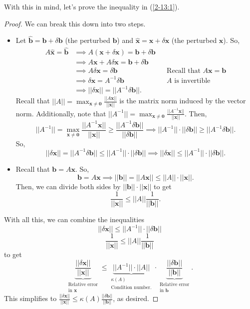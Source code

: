 \documentclass[letterpaper]{article}
\newcommand{\0}{\mathbf{0}}
\renewcommand{\b}{\mathbf{b}}
\newcommand{\x}{\mathbf{x}}
\begin{document}
With this in mind, let's prove the inequality in (\ref{2-13:1}).
\begin{proof}
    We can break this down into two steps. 
    \begin{itemize}
        \item Let $\hat{\b} = \b + \delta\b$ (the perturbed $\b$) and $\hat{\x} = \x + \delta\x$ (the perturbed $\x$). So, 
        \begin{equation*}
            \begin{aligned}
                A\hat{\x} = \hat{\b} &\implies A(\x + \delta\x) = \b + \delta\b \\ 
                    &\implies A\x + A\delta\x = \b + \delta\b \\ 
                    &\implies A\delta\x = \delta\b && \text{Recall that } A\x = \b \\ 
                    &\implies \delta\x = A^{-1}\delta\b && A \text{ is invertible} \\ 
                    &\implies ||\delta\x|| = ||A^{-1} \delta\b||.
            \end{aligned}
        \end{equation*}
        Recall that $||A|| = \max_{\x \neq \0} \frac{||A\x||}{||\x||}$ is the matrix norm induced by the vector norm. Additionally, note that $||A^{-1}|| = \max_{\x \neq \0} \frac{||A^{-1}\x||}{||\x||}$. Then,
        \[||A^{-1}|| = \max_{\x \neq \0} \frac{||A^{-1}\x||}{||\x||} \geq \frac{||A^{-1}\delta\b||}{||\delta\b||} \implies ||A^{-1}|| \cdot ||\delta\b|| \geq ||A^{-1}\delta\b||.\]
        So, 
        \[||\delta\x|| = ||A^{-1} \delta\b|| \leq ||A^{-1}|| \cdot ||\delta\b|| \implies ||\delta\x|| \leq ||A^{-1}|| \cdot ||\delta\b||.\]

        \item Recall that $\b = A\x$. So, 
        \[\b = A\x \implies ||\b|| = ||A\x|| \leq ||A|| \cdot ||\x||.\]
        Then, we can divide both sides by $||\b|| \cdot ||\x||$ to get 
        \[\frac{1}{||\x||} \leq ||A||\frac{1}{||\b||}.\]
    \end{itemize}
    With all this, we can combine the inequalities
    \[||\delta\x|| \leq ||A^{-1}|| \cdot ||\delta\b||\]
    \[\frac{1}{||\x||} \leq ||A||\frac{1}{||\b||}\]
    to get 
    \[\underbrace{\frac{||\delta\x||}{||\x||}}_{\substack{\text{Relative error} \\ \text{in } \x}} \leq \underbrace{||A^{-1}|| \cdot ||A||}_{\substack{\kappa(A) \\ \text{Condition number.}}} \cdot \underbrace{\frac{||\delta\b||}{||\b||}}_{\substack{\text{Relative error} \\ \text{in } \b}}.\]
   This simplifies to $\frac{||\delta\x||}{||\x||} \leq \kappa(A)\frac{||\delta\b||}{||\b||}$, as desired.  
\end{proof}
\end{document}
